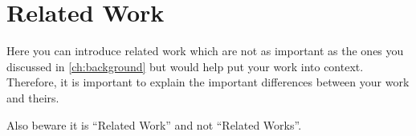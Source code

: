 \chapter{Related Work}\label{ch:relatedwork}

Here you can introduce related work which are not as important as the ones you discussed in \cref{ch:background} but would help put your work into context.
Therefore, it is important to explain the important differences between your work and theirs.

Also beware it is ``Related Work'' and not ``Related Works''.